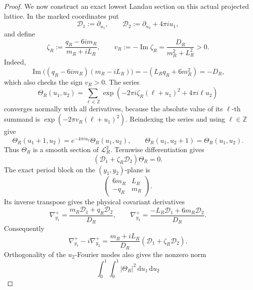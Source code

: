 \begin{proof}
We now construct an exact lowest Landau section on this actual projected
lattice.  In the marked coordinates put
\[
 \mathcal D_1:=\partial_{u_1},
 \qquad
 \mathcal D_2:=\partial_{u_2}+4\pi i u_1,
\]
and define
\begin{equation}
 \zeta_R:=\frac{q_R-6im_R}{m_R+iL_R},
 \qquad
 v_R:=-\operatorname{Im}\zeta_R
     =\frac{D_R}{m_R^2+L_R^2}>0.
 \label{cusp-magnetic-theta-parameter}
\end{equation}
Indeed,
\[
 \operatorname{Im}\bigl((q_R-6im_R)(m_R-iL_R)\bigr)
 =-(L_Rq_R+6m_R^2)=-D_R,
\]
which also checks the sign \(v_R>0\).
The series
\begin{equation}
 \Theta_R(u_1,u_2)
 =\sum_{\ell\in\mathbb Z}
 \exp\!\left(
  -2\pi i\zeta_R(\ell+u_1)^2+4\pi i\ell u_2
 \right)
 \label{cusp-magnetic-theta-series}
\end{equation}
converges normally with all derivatives, because the absolute value of
its \(\ell\)-th summand is
\(\exp(-2\pi v_R(\ell+u_1)^2)\).  Reindexing the series and using
\(\ell\in\mathbb Z\) give
\begin{equation}
 \Theta_R(u_1+1,u_2)=e^{-4\pi i u_2}\Theta_R(u_1,u_2),
 \qquad
 \Theta_R(u_1,u_2+1)=\Theta_R(u_1,u_2).
 \label{cusp-magnetic-theta-automorphy}
\end{equation}
Thus \(\Theta_R\) is a smooth section of \(\mathscr L_R^2\).  Termwise
differentiation gives
\begin{equation}
 (\mathcal D_1+\zeta_R\mathcal D_2)\Theta_R=0.
 \label{cusp-magnetic-theta-marked-equation}
\end{equation}
The exact period block on the \((y_1,y_2)\)-plane is
\[
 \begin{pmatrix}6m_R&L_R\\-q_R&m_R\end{pmatrix}.
\]
Its inverse transpose gives the physical covariant derivatives
\begin{equation}
 \nabla_{y_1}^+
  =\frac{m_R\mathcal D_1+q_R\mathcal D_2}{D_R},
 \qquad
 \nabla_{y_2}^+
  =\frac{-L_R\mathcal D_1+6m_R\mathcal D_2}{D_R}.
 \label{cusp-magnetic-physical-root-derivatives}
\end{equation}
Consequently
\begin{equation}
 \nabla_{y_1}^+-i\nabla_{y_2}^+
 =\frac{m_R+iL_R}{D_R}
   (\mathcal D_1+\zeta_R\mathcal D_2).
 \label{cusp-magnetic-annihilator-conversion}
\end{equation}
Orthogonality of the \(u_2\)-Fourier modes also gives the nonzero norm
\[
 \int_0^1\!\!\int_0^1\lvert\Theta_R\rvert^2
 \,\mathrm du_1\,\mathrm du_2
\]
\end{proof}
